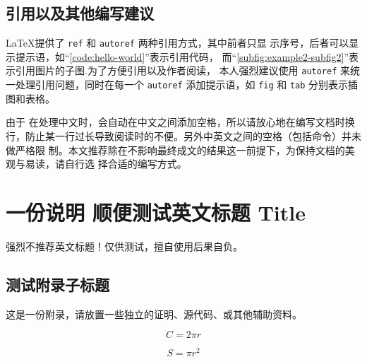 \documentclass[lang=chs, degree=phd, blindreview=false, winfonts=true, academic=true]{yanputhesis}
\begin{document}
\section{引用以及其他编写建议}

\LaTeX 提供了 \lstinline`ref` 和 \lstinline`autoref` 两种引用方式，其中前者只显
示序号，后者可以显示提示语，如“\autoref{code:hello-world}”表示引用代码，
而“\autoref{subfig:example2-subfig2}”表示引用图片的子图.为了方便引用以及作者阅读，
本人强烈建议使用 \lstinline`autoref` 来统一处理引用问题，同时在每一个
\lstinline`autoref` 添加提示语，如 \lstinline`fig` 和 \lstinline`tab` 分别表示插
图和表格。

由于 \XeLaTeX 在处理中文时，会自动在中文之间添加空格，所以请放心地在编写文档时换
行，防止某一行过长导致阅读时的不便。另外中英文之间的空格（包括命令）并未做严格限
制。本文推荐除在不影响最终成文的结果这一前提下，为保持文档的美观与易读，请自行选
择合适的编写方式。

\cleardoublepage
\appendix
\chapter{一份说明 顺便测试英文标题 Title}

强烈不推荐英文标题！仅供测试，擅自使用后果自负。

\section{测试附录子标题}

这是一份附录，请放置一些独立的证明、源代码、或其他辅助资料。


\begin{equation}
    C = 2 \pi r
\end{equation}

\begin{equation}
    S = \pi r^2
\end{equation}

\cleardoublepage
\end{document}
